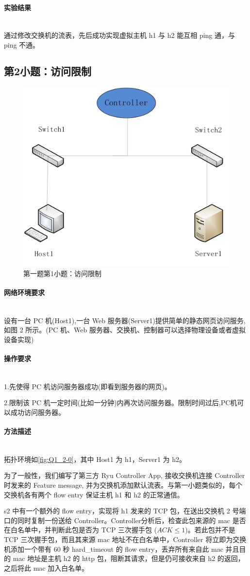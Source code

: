 \documentclass[format=draft,language=chinese,category=SDN]{hustreport}
\newcommand{\myparagraph}[1]{\paragraph{#1}\mbox{}\\}
\begin{document}
\myparagraph{实验结果}
通过修改交换机的流表，先后成功实现虚拟主机 h1 与 h2 能互相 ping 通，与 ping 不通。

\clearpage

\subsection{第2小题：访问限制}\label{sec:Q1_2}

\begin{figure}[!h]
\centering
\includegraphics[width=.618\textwidth]{fig/1_2-0.png}
\caption{第一题第1小题：访问限制}\label{fig:Q1_2-0}
\end{figure}

\myparagraph{网络环境要求}
设有一台 PC 机(Host1),一台 Web 服务器(Server1)提供简单的静态网页访问服务,如图 2 所示。(PC 机、Web 服务器、交换机、控制器可以选择物理设备或者虚拟设备实现)

\myparagraph{操作要求}
1.先使得 PC 机访问服务器成功(即看到服务器的网页)。

2.限制该 PC 机一定时间(比如一分钟)内再次访问服务器。限制时间过后,PC机可以成功访问服务器。

\myparagraph{方法描述}
拓扑环境如\autoref{fig:Q1_2-0}，其中 Host1 为 h1，Server1 为 h2。

为了一般性，我们编写了第三方 Ryu Controller App, 接收交换机连接 Controller 时发来的 Feature message, 并为交换机添加默认流表。与第一小题类似的，每个交换机各有两个 flow entry 保证主机 h1 和 h2 的正常通信。

s2 中有一个额外的 flow entry，实现将 h1 发来的 TCP 包，在送出交换机 2 号端口的同时复制一份送给 Controller。Controller分析后，检查此包来源的 mac 是否在白名单中，并判断此包是否为 TCP 三次握手包 ($ACK \leq 1$)。若此包并不是 TCP 三次握手包，而且其来源 mac 地址不在白名单中，Controller 将立即为交换机添加一个带有 60 秒 hard\_timeout 的 flow entry，丢弃所有来自此 mac 并且目的 mac 地址是主机 h2 的 http 包，阻断其请求，但是仍可接收来自 h2 的返回，之后将此 mac 加入白名单。
\end{document}
